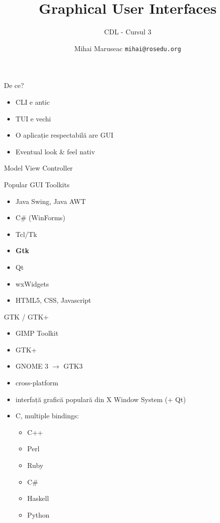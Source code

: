 \documentclass{beamer}
\title[GUI]{Graphical User Interfaces}
\subtitle{CDL - Cursul 3}
\institute[ROSEdu]{ROSEdu}
\author[MM]{Mihai Maruseac \texttt{mihai@rosedu.org}}
\begin{document}
\maketitle

\begin{frame}{De ce?}
  \begin{itemize}[<+->]
    \item CLI e antic
    \item TUI e vechi
    \item O aplicație respectabilă are GUI
    \item Eventual look \& feel nativ
  \end{itemize}
\end{frame}

\begin{frame}{Model View Controller}
  \begin{center}
  \end{center}
\end{frame}

\begin{frame}{Popular GUI Toolkits}
  \begin{itemize}
    \item Java Swing, Java AWT
    \item C\# (WinForms)
    \item Tcl/Tk
    \item \textbf{Gtk}
    \item Qt
    \item wxWidgets
    \item HTML5, CSS, Javascript
  \end{itemize}
\end{frame}

\begin{frame}{GTK / GTK+}
  \begin{itemize}[<+->]
    \item GIMP Toolkit
    \item GTK+
    \item GNOME 3 $\rightarrow$ GTK3
    \item cross-platform
    \item interfață grafică populară din X Window System (+ Qt)
    \item C, multiple bindings:
      \begin{itemize}
        \item C++
        \item Perl
        \item Ruby
        \item C\#
        \item Haskell
        \item Python
      \end{itemize}
  \end{itemize}
\end{frame}
\end{document}
